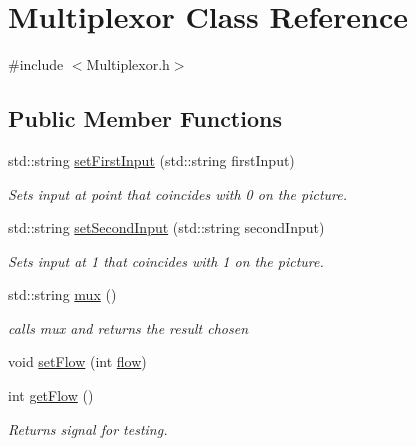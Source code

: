 \hypertarget{class_multiplexor}{}\section{Multiplexor Class Reference}
\label{class_multiplexor}


{\ttfamily \#include $<$Multiplexor.\+h$>$}

\subsection*{Public Member Functions}
\begin{DoxyCompactItemize}
\item 
\mbox{\label{class_multiplexor_a69c9a975586cc73853780b769e275763}} 
std\+::string \mbox{\hyperlink{class_multiplexor_a69c9a975586cc73853780b769e275763}{set\+First\+Input}} (std\+::string first\+Input)
\begin{DoxyCompactList}\small\item\em Set\textquotesingle{}s input at point that coincides with 0 on the picture. \end{DoxyCompactList}\item 
\mbox{\label{class_multiplexor_afcc3b61e4bb50501e5f11f81d6603641}} 
std\+::string \mbox{\hyperlink{class_multiplexor_afcc3b61e4bb50501e5f11f81d6603641}{set\+Second\+Input}} (std\+::string second\+Input)
\begin{DoxyCompactList}\small\item\em Sets input at 1 that coincides with 1 on the picture. \end{DoxyCompactList}\item 
\mbox{\label{class_multiplexor_aa6d73bfebf640401b42562534694cd02}} 
std\+::string \mbox{\hyperlink{class_multiplexor_aa6d73bfebf640401b42562534694cd02}{mux}} ()
\begin{DoxyCompactList}\small\item\em calls mux and returns the result chosen \end{DoxyCompactList}\item 
void \mbox{\hyperlink{class_multiplexor_aaf700f773d80deaa3af4cb8aec0f9b41}{set\+Flow}} (int \mbox{\hyperlink{class_multiplexor_aa38f2d5057c2c76b799fa66645662b55}{flow}})
\item 
\mbox{\label{class_multiplexor_aa2483f83fbb3c17b0ffcff36893f4314}} 
int \mbox{\hyperlink{class_multiplexor_aa2483f83fbb3c17b0ffcff36893f4314}{get\+Flow}} ()
\begin{DoxyCompactList}\small\item\em Returns signal for testing. \end{DoxyCompactList}\end{DoxyCompactItemize}
